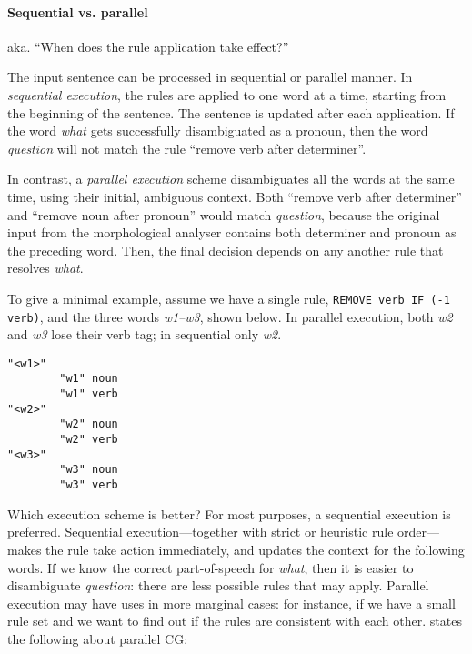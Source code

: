 \paragraph{Sequential vs. parallel}

aka. ``When does the rule application take effect?''

The input sentence can be processed in sequential or parallel manner.
In \emph{sequential execution}, the rules are applied to one word at a time, starting from the beginning of the sentence. The sentence is updated after each application. If the word \emph{what} gets successfully disambiguated as a pronoun, then the word \emph{question} will not match the rule ``remove verb after determiner''.


In contrast, a \emph{parallel execution} scheme disambiguates all the words at the same 
time, using their initial, ambiguous context. Both ``remove verb after determiner'' and 
``remove noun after pronoun'' would match \emph{question}, because the original 
input from the morphological analyser contains both determiner and pronoun as the 
preceding word. Then, the final decision depends on any another rule that resolves \emph{what}.

To give a minimal example, assume we have a single rule, \texttt{REMOVE verb IF (-1 verb)}, and the three words \emph{w1--w3}, shown below. 
In parallel execution, both \emph{w2} and \emph{w3} lose their verb tag; in sequential only \emph{w2}.


\begin{verbatim}
"<w1>"
        "w1" noun
        "w1" verb
"<w2>"
        "w2" noun
        "w2" verb
"<w3>"
        "w3" noun
        "w3" verb
\end{verbatim}


Which execution scheme is better? For most purposes, a sequential execution is preferred.  Sequential execution–--together with strict or heuristic rule order---makes the rule take action immediately, and updates the context for the following words. 
If we know the correct part-of-speech for \emph{what}, then it is easier to disambiguate \emph{question}: there are less possible rules that may apply. 
Parallel execution may have uses in more marginal cases: for instance, if we have a small rule set and we want to find out if the rules are consistent with each other.
\cite{koskenniemi90} states the following about parallel CG:

